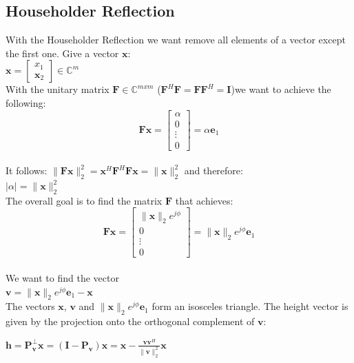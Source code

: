 \documentclass[english]{latex4ei/latex4ei_sheet}
\begin{document}
\begin{sectionbox}
\subsection{Householder Reflection}
With the Householder Reflection we want remove all elements of a vector except the first one. Give a vector $\mathbf{x}$:\\
$\mathbf{x} = \begin{bmatrix}
	x_1\\
	\mathbf{x}_2
\end{bmatrix}\in\mathbb{C}^m$\\

With the unitary matrix $\mathbf{F}\in\mathbb{C}^{mxm}$ ($\mathbf{F}^H\mathbf{F}=\mathbf{F}\mathbf{F}^H = \mathbf{I}$)we want to achieve the following:\\
$$\mathbf{F}\mathbf{x} = \begin{bmatrix}
	\alpha\\
	0\\
	\vdots\\
	0
\end{bmatrix} = \alpha \mathbf{e}_1$$\\
It follows: $\parallel\mathbf{F}\mathbf{x}\parallel_2^2 = \mathbf{x}^H\mathbf{F}^H\mathbf{F}\mathbf{x} = \parallel \mathbf{x}\parallel_2^2$ and therefore:\\
$|\alpha| = \parallel \mathbf{x}\parallel_2^2$\\
The overall goal is to find the matrix $\mathbf{F}$ that achieves:
$$\mathbf{F}\mathbf{x} = \begin{bmatrix}
	\parallel \mathbf{x}\parallel_2 e^{j\phi}\\
	0\\
	\vdots\\
	0
\end{bmatrix} = \parallel \mathbf{x}\parallel_2 e^{j\phi} \mathbf{e}_1$$\\
We want to find the vector\\

$\mathbf{v} = \parallel\mathbf{x}\parallel_2 e^{j\phi}\mathbf{e}_1 - \mathbf{x}$\\

The vectors $\mathbf{x}$, $\mathbf{v}$ and $\parallel\mathbf{x}\parallel_2 e^{j\phi}\mathbf{e}_1$ form an isosceles triangle. The height vector is given by the projection onto the orthogonal complement of $\mathbf{v}$:

$\mathbf{h} = \mathbf{P}^\perp_\mathbf{v}\mathbf{x} = (\mathbf{I} - \mathbf{P}_\mathbf{v})\mathbf{x} = \mathbf{x} - \frac{\mathbf{v}\mathbf{v}^H}{\parallel\mathbf{v}\parallel_2^2} \mathbf{x}$


\end{sectionbox}
\end{document}
